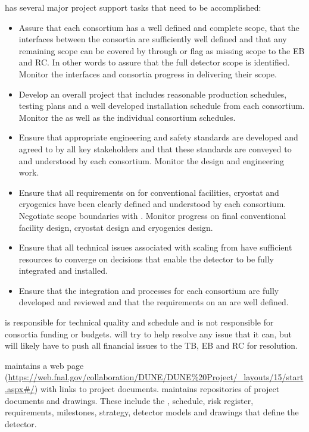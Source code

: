  has several major project support tasks that need to be accomplished:
\begin{itemize}
  \item Assure that each consortium has a well defined and complete
    scope, that the interfaces between the consortia are sufficiently
    well defined and that any remaining scope can be covered by 
    through  or flag as missing scope to the EB and RC. In
    other words to assure that the full detector scope is
    identified. Monitor the interfaces and consortia progress in
    delivering their scope.
  \item Develop an overall project 
    that includes reasonable production schedules, testing plans and a
    well developed installation schedule from each consortium. Monitor
    the  as well as the individual consortium schedules.
  \item Ensure that appropriate engineering and safety standards are
    developed and agreed to by all key stakeholders and that these
    standards are conveyed to and understood by each
    consortium. Monitor the design and engineering work.
  \item Ensure that all  requirements on  for
    conventional facilities, cryostat and cryogenics have been clearly
    defined and understood by each consortium. Negotiate scope
    boundaries with . Monitor  progress on
    final conventional facility design, cryostat design and cryogenics
    design.
  \item Ensure that all technical issues associated with scaling from
     have sufficient resources to converge on
    decisions that enable the detector to be fully integrated and
    installed.
  \item Ensure that the integration and  processes for each
    consortium are fully developed and reviewed and that the
    requirements on an  are well defined.
\end{itemize}

 is responsible for technical quality and schedule and is not
responsible for consortia funding or budgets.   will try to help
resolve any issue that it can, but will likely have to push all
financial issues to the TB, EB and RC for resolution.

 maintains a web page
(\url{https://web.fnal.gov/collaboration/DUNE/DUNE\%20Project/\_layouts/15/start.aspx\#/})
with links to project documents.  maintains repositories of project
documents and drawings. These include the , schedule, risk
register, requirements, milestones, strategy, detector models and
drawings that define the  detector.


